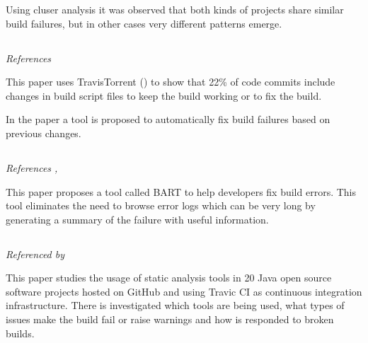 \documentclass[]{book}
\begin{document}
Using cluser analysis it was observed that both kinds of projects share
similar build failures, but in other cases very different patterns
emerge.

\subsection{\texorpdfstring{\citet{hassan2018hirebuild}}{@hassan2018hirebuild}}\label{hassan2018hirebuild}

\emph{References \citet{beller2017travistorrent} }

This paper uses TravisTorrent (\citet{beller2017travistorrent}) to show
that 22\% of code commits include changes in build script files to keep
the build working or to fix the build.

In the paper a tool is proposed to automatically fix build failures
based on previous changes.

\subsection{\texorpdfstring{\citet{vassallo2018break}}{@vassallo2018break}}\label{vassallo2018break}

\emph{References \citet{beller2017oops}, \citet{rausch2017empirical} }

This paper proposes a tool called \textsc{BART} to help developers fix
build errors. This tool eliminates the need to browse error logs which
can be very long by generating a summary of the failure with useful
information.

\subsection{\texorpdfstring{\citet{zampetti2017open}}{@zampetti2017open}}\label{zampetti2017open}

\emph{Referenced by \citet{vassallo2018break} }

This paper studies the usage of static analysis tools in 20 Java open
source software projects hosted on GitHub and using Travic CI as
continuous integration infrastructure. There is investigated which tools
are being used, what types of issues make the build fail or raise
warnings and how is responded to broken builds.

\subsection{\texorpdfstring{\citet{baltes2018no}}{@baltes2018no}}\label{baltes2018no}
\end{document}

